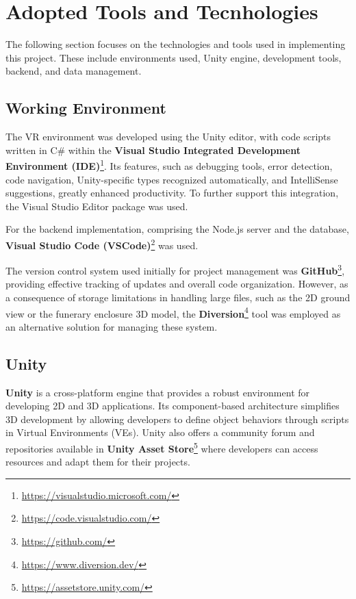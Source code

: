 \section{Adopted Tools and Tecnhologies}
\label{sec:tools}
The following section focuses on the technologies and tools used in implementing this project. 
These include environments used, Unity engine, development tools, backend, and data management.
\subsection{Working Environment}

The  \gls{VR} environment was developed using the Unity editor, with code scripts written in C\# within the \textbf{Visual Studio Integrated Development Environment (IDE)}\footnote{\url{https://visualstudio.microsoft.com/}}.
Its features, such as debugging tools, error detection, code navigation, Unity-specific types recognized automatically, and IntelliSense suggestions, greatly enhanced productivity. 
To further support this integration, the Visual Studio Editor package was used. 

For the backend implementation, comprising the Node.js server and the database, \textbf{Visual Studio Code (VSCode)}\footnote{\url{https://code.visualstudio.com/}} was used. 

The version control system used initially for project management was \textbf{GitHub}\footnote{\url{https://github.com/}}, providing effective tracking of updates and overall code organization.
However, as a consequence of storage limitations in handling large files, such as the \gls{2D} ground view or the funerary enclosure \gls{3D} model, the \textbf{Diversion}\footnote{\url{https://www.diversion.dev/}} tool was employed as an alternative solution for managing these system.

\subsection{Unity}
\textbf{Unity} is a cross-platform engine that provides a robust environment for developing \gls{2D} and \gls{3D} applications. 
Its component-based architecture simplifies \gls{3D} development by allowing developers to define object behaviors through scripts in Virtual Environments (\glspl{VE}).
Unity also offers a community forum and repositories available in \textbf{Unity Asset Store}\footnote{\url{https://assetstore.unity.com/}} where developers can access resources and adapt them for their projects.


